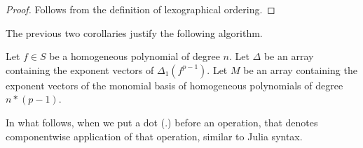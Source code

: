 \begin{proof}
	Follows from the definition of lexographical
	ordering.
\end{proof}

The previous two corollaries justify
the following algorithm.

\begin{cxt}
	Let \(f \in S\) be a homogeneous
	polynomial of degree \(n\).
	Let \(\Delta\) be an array containing the 
	exponent vectors of \(\Delta_{1}(f^{p-1})\).
	Let \(M\) be an array containing the exponent
	vectors of the monomial basis of
	homogeneous polynomials of degree
	\(n*(p-1)\).
\end{cxt}

In what follows, when we put a dot (\(.\))
before an operation, that denotes
componentwise application
of that operation, similar to Julia syntax.


